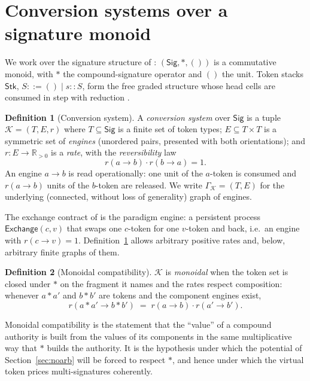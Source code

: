 \documentclass[11pt]{article}
\theoremstyle{definition}
\newtheorem{definition}{Definition}[section]
\theoremstyle{plain}
\theoremstyle{remark}
\newcommand{\Sig}{\mathsf{Sig}}
\newcommand{\Stk}{\mathsf{Stk}}
\newcommand{\Tok}{T}
\newcommand{\Rpos}{\mathbb{R}_{>0}}
\begin{document}
\section{Conversion systems over a signature monoid}
\label{sec:conv}

We work over the signature structure of \cite{CE}: $(\Sig,\ast,())$ is a commutative monoid, with
$\ast$ the compound-signature operator and $()$ the unit. Token stacks $\Stk$, $S::=()\mid s::S$,
form the free graded structure whose head cells are consumed in step with reduction \cite{CE}.

\begin{definition}[Conversion system]\label{def:conv}
A \emph{conversion system} over $\Sig$ is a tuple $\mathcal{K}=(\Tok,E,r)$ where $\Tok\subseteq\Sig$
is a finite set of token types; $E\subseteq \Tok\times \Tok$ is a symmetric set of \emph{engines}
(unordered pairs, presented with both orientations); and $r:E\to\Rpos$ is a \emph{rate}, with the
\emph{reversibility} law
\[
  r(a\!\to\! b)\cdot r(b\!\to\! a)=1 .
\]
An engine $a\!\to\! b$ is read operationally: one unit of the $a$-token is consumed and
$r(a\!\to\! b)$ units of the $b$-token are released. We write $\Gamma_{\mathcal K}=(\Tok,E)$ for
the underlying (connected, without loss of generality) graph of engines.
\end{definition}

The exchange contract of \cite[App.~B.9]{CARho} is the paradigm engine: a persistent process
$\mathsf{Exchange}(c,v)$ that swaps one $c$-token for one $v$-token and back, i.e.\ an engine with
$r(c\!\to\! v)=1$. Definition~\ref{def:conv} allows arbitrary positive rates and, below, arbitrary
finite graphs of them.

\begin{definition}[Monoidal compatibility]\label{def:monoidal}
$\mathcal K$ is \emph{monoidal} when the token set is closed under $\ast$ on the fragment it names
and the rates respect composition: whenever $a\ast a'$ and $b\ast b'$ are tokens and the component
engines exist,
\[
  r(a\ast a' \to b\ast b') \;=\; r(a\!\to\! b)\cdot r(a'\!\to\! b') .
\]
\end{definition}

Monoidal compatibility is the statement that the ``value'' of a compound authority is built from
the values of its components in the same multiplicative way that $\ast$ builds the authority. It is
the hypothesis under which the potential of Section~\ref{sec:noarb} will be forced to respect
$\ast$, and hence under which the virtual token prices multi-signatures coherently.
\end{document}
